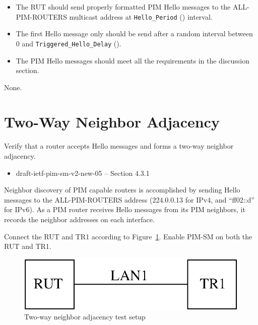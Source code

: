 \documentclass[11pt]{report}
\begin{document}
\begin{itemize}

  \item The RUT should send properly formatted PIM Hello messages to the
        ALL-PIM-ROUTERS multicast address at \verb=Hello_Period=
        ({\PimsmHelloPeriod}) interval.

  \item The first Hello message only should be send after a random
        interval between 0 and \verb=Triggered_Hello_Delay=
        ({\PimsmTriggeredHelloDelay}).

  \item The PIM Hello messages should meet all the requirements in the
        discussion section.

\end{itemize}

None.

\newpage
\section{Two-Way Neighbor Adjacency}

Verify that a router accepts Hello messages and forms a two-way neighbor
adjacency.

\begin{itemize}
  \item draft-ietf-pim-sm-v2-new-05 -- Section 4.3.1
\end{itemize}

Neighbor discovery of PIM capable routers is accomplished by sending Hello
messages to the ALL-PIM-ROUTERS address (224.0.0.13 for IPv4,
and ``ff02::d'' for IPv6). As a PIM router receives Hello messages from its
PIM neighbors, it records the neighbor addresses on each interface.

Connect the RUT and TR1 according to
Figure~\ref{fig:two_way_neighbor_adjacency}.
Enable PIM-SM on both the RUT and TR1.

\begin{figure}[htbp]
  \begin{center}
    \includegraphics[scale=0.8]{figs/pim_test_2_2_two_way_neighbor_adjacency}
    \caption{Two-way neighbor adjacency test setup}
    \label{fig:two_way_neighbor_adjacency}
  \end{center}
\end{figure}
\end{document}
